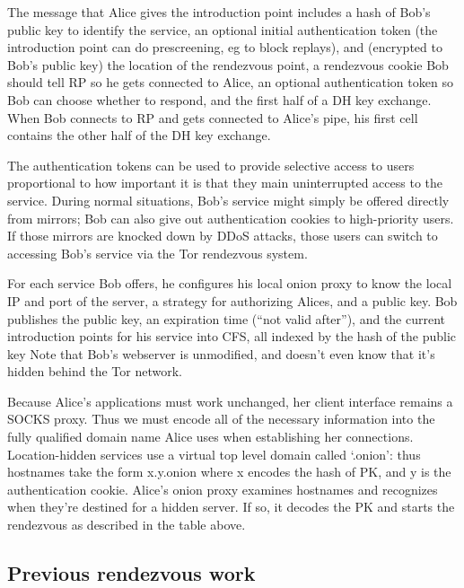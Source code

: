 \documentclass[times,10pt,twocolumn]{article}
\begin{document}
The message that Alice gives the introduction point includes a hash of Bob's
public key to identify the service, an optional initial authentication
token (the introduction point can do prescreening, eg to block replays),
and (encrypted to Bob's public key) the location of the rendezvous point,
a rendezvous cookie Bob should tell RP so he gets connected to
Alice, an optional authentication token so Bob can choose whether to respond,
and the first half of a DH key exchange. When Bob connects to RP
and gets connected to Alice's pipe, his first cell contains the
other half of the DH key exchange.

The authentication tokens can be used to provide selective access to users
proportional to how important it is that they main uninterrupted access
to the service. During normal situations, Bob's service might simply be
offered directly from mirrors; Bob can also give out authentication cookies
to high-priority users. If those mirrors are knocked down by DDoS attacks,
those users can switch to accessing Bob's service via the Tor
rendezvous system.


For each service Bob offers, he configures his local onion proxy to know
the local IP and port of the server, a strategy for authorizing Alices,
and a public key.   Bob publishes
the public key, an expiration
time (``not valid after''), and the current introduction points for
his
service into CFS, all indexed by the hash of the public key
Note that Bob's webserver is unmodified, and doesn't even know
that it's hidden behind the Tor network.

Because Alice's applications must work unchanged, her client interface
remains a SOCKS proxy.  Thus we must encode all of the necessary
information into the fully qualified domain name Alice uses when
establishing her connections.  Location-hidden services use a virtual
top level domain called `.onion': thus hostnames take the form
x.y.onion where x encodes the hash of PK, and y is the authentication
cookie. Alice's onion proxy examines hostnames and recognizes when
they're destined for a hidden server. If so, it decodes the PK and
starts the rendezvous as described in the table above.

\subsection{Previous rendezvous work}
\end{document}
